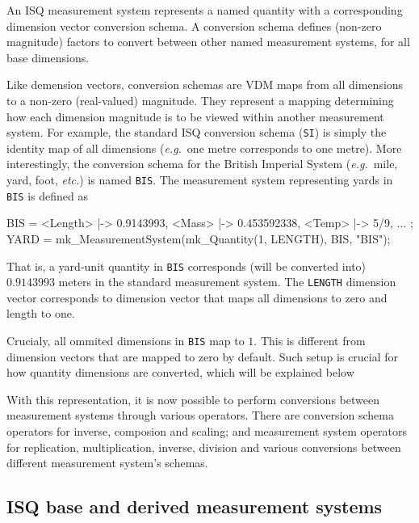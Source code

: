 \documentclass[runningheads,a4paper]{llncs}
\begin{document}
An ISQ measurement system represents a named quantity with a corresponding dimension vector conversion schema. A conversion schema defines (non-zero magnitude) factors to convert between other named measurement systems, for all base dimensions. 

Like demension vectors, conversion schemas are VDM maps from all dimensions to a non-zero (real-valued) magnitude.    
They represent a mapping determining how each dimension magnitude is to be viewed within another measurement system. For example, the standard ISQ conversion schema (\texttt{SI}) is simply the identity map of all dimensions (\textit{e.g.}~one metre corresponds to one metre). More interestingly, the conversion schema for the British Imperial System (\textit{e.g.}~mile, yard, foot, \textit{etc.}) is named \texttt{BIS}. The measurement system representing yards in \texttt{BIS} is defined as     
%
\begin{vdmsl}[frame=none,basicstyle=\ttfamily\scriptsize]
  BIS  = { <Length> |-> 0.9143993, <Mass> |-> 0.453592338, <Temp> |-> 5/9, ... };
  YARD = mk_MeasurementSystem(mk_Quantity(1, LENGTH), BIS, "BIS");
\end{vdmsl}          
%
\noindent That is, a yard-unit quantity in \texttt{BIS} corresponds (will be converted into) \(0.9143993\) meters in the standard measurement system. The \texttt{LENGTH} dimension vector corresponds to dimension vector that maps all dimensions to zero and length to one.    

Crucialy, all ommited dimensions in \texttt{BIS} map to \(1\). This is different from dimension vectors that are mapped to zero by default. Such setup is crucial for how quantity dimensions are converted, which will be explained below

With this representation, it is now possible to perform conversions between measurement systems through various operators. There are conversion schema operators for inverse, composion and scaling; and measurement system operators for replication, multiplication, inverse, division and various conversions between different measurement system's schemas. 

\subsection*{ISQ base and derived measurement systems}
\end{document}

